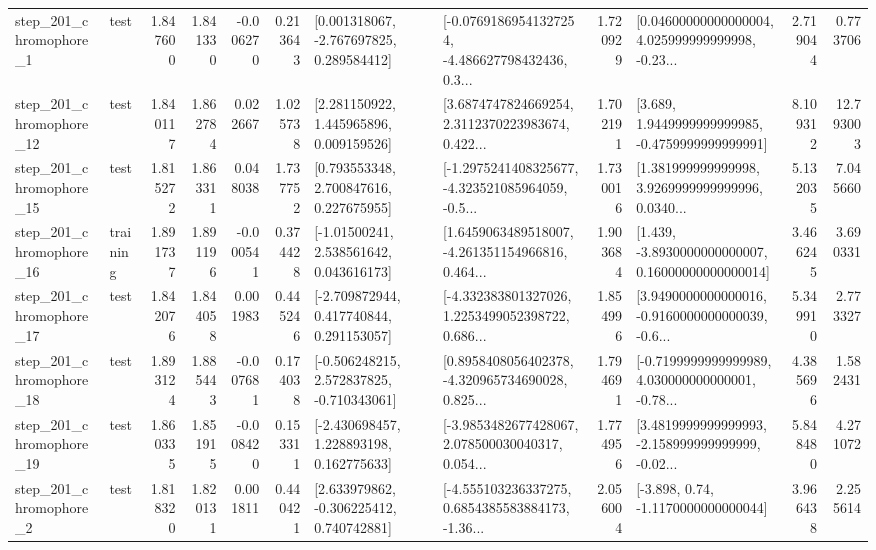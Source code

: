 \begin{tabular}{llrrrrllrlrr}
   step\_201\_chromophore\_1 &      test &      1.847600 &    1.841330 &     -0.006270 &  0.213643 &    [0.001318067, -2.767697825, 0.289584412] &  [-0.07691869541327254, -4.486627798432436, 0.3... &       1.720929 &  [0.04600000000000004, 4.025999999999998, -0.23... &            2.719044 &          0.773706 \\
  step\_201\_chromophore\_12 &      test &      1.840117 &    1.862784 &      0.022667 &  1.025738 &     [2.281150922, 1.445965896, 0.009159526] &  [3.6874747824669254, 2.3112370223983674, 0.422... &       1.702191 &   [3.689, 1.9449999999999985, -0.4759999999999991] &            8.109312 &         12.793003 \\
  step\_201\_chromophore\_15 &      test &      1.815272 &    1.863311 &      0.048038 &  1.737752 &     [0.793553348, 2.700847616, 0.227675955] &  [-1.2975241408325677, -4.323521085964059, -0.5... &       1.730016 &  [1.381999999999998, 3.9269999999999996, 0.0340... &            5.132035 &          7.045660 \\
  step\_201\_chromophore\_16 &  training &      1.891737 &    1.891196 &     -0.000541 &  0.374428 &     [-1.01500241, 2.538561642, 0.043616173] &  [1.6459063489518007, -4.261351154966816, 0.464... &       1.903684 &  [1.439, -3.8930000000000007, 0.16000000000000014] &            3.466245 &          3.690331 \\
  step\_201\_chromophore\_17 &      test &      1.842076 &    1.844058 &      0.001983 &  0.445246 &    [-2.709872944, 0.417740844, 0.291153057] &  [-4.332383801327026, 1.2253499052398722, 0.686... &       1.854996 &  [3.9490000000000016, -0.9160000000000039, -0.6... &            5.349910 &          2.773327 \\
  step\_201\_chromophore\_18 &      test &      1.893124 &    1.885443 &     -0.007681 &  0.174038 &   [-0.506248215, 2.572837825, -0.710343061] &  [0.8958408056402378, -4.320965734690028, 0.825... &       1.794691 &  [-0.7199999999999989, 4.030000000000001, -0.78... &            4.385696 &          1.582431 \\
  step\_201\_chromophore\_19 &      test &      1.860335 &    1.851915 &     -0.008420 &  0.153311 &    [-2.430698457, 1.228893198, 0.162775633] &  [-3.9853482677428067, 2.078500030040317, 0.054... &       1.774956 &  [3.4819999999999993, -2.158999999999999, -0.02... &            5.848480 &          4.271072 \\
   step\_201\_chromophore\_2 &      test &      1.818320 &    1.820131 &      0.001811 &  0.440421 &    [2.633979862, -0.306225412, 0.740742881] &  [-4.555103236337275, 0.6854385583884173, -1.36... &       2.056004 &                [-3.898, 0.74, -1.1170000000000044] &            3.966438 &          2.255614 \\

\end{tabular}
